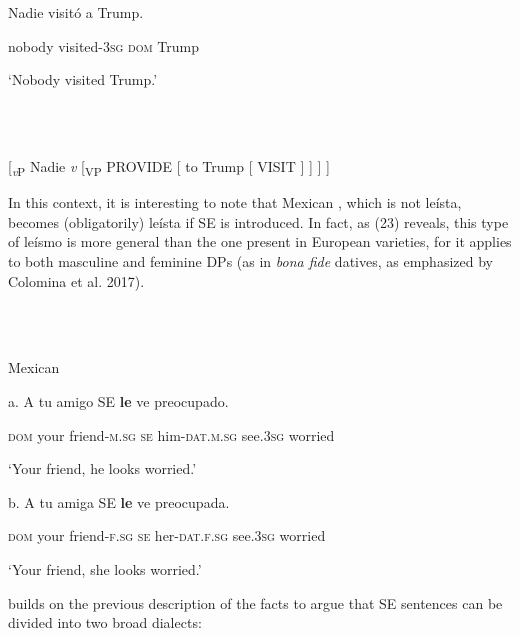 \documentclass[output=paper]{langsci/langscibook}
\begin{document}
\ea%
    \label{ex:key:21}
    \gll\\
        \\
    \glt
    \z


Nadie    visitó             a          Trump.   

nobody  visited\textsc{{}-3}\textsc{sg  dom}   Trump

‘Nobody visited Trump.’

\ea%
    \label{ex:key:22}
    \gll\\
        \\
    \glt
    \z

          [\textit{\textsubscript{v}}\textsubscript{P} Nadie \textit{v} [\textsubscript{VP} PROVIDE [ to Trump [ VISIT ] ] ] ]

In this context, it is interesting to note that Mexican , which is not leísta, becomes (obligatorily) leísta if SE is introduced. In fact, as (23) reveals, this type of leísmo is more general than the one present in European varieties, for it applies to both masculine and feminine DPs (as in \textit{bona fide} datives, as emphasized by Colomina et al. 2017).

\ea%
    \label{ex:key:23}
    \gll\\
        \\
    \glt
    \z

          Mexican 

a. A       tu      amigo         SE  \textbf{le} ve         preocupado.  

            \textsc{dom}   your friend\textsc{{}-m.}\textsc{sg} \textsc{se}   him\textsc{{}-dat.m.}\textsc{sg}  see\textsc{.3sg} worried

      ‘Your friend, he looks worried.’

  b. A       tu      amiga        SE  \textbf{le} ve          preocupada. 

            \textsc{dom}   your friend\textsc{{}-f.}\textsc{sg} \textsc{se}   her\textsc{{}-dat.f.}\textsc{sg} see\textsc{.3sg} worried

      ‘Your friend, she looks worried.’

\citet{Gallego2016} builds on the previous description of the facts to argue that  SE sentences can be divided into two broad dialects:

\ea%
    \label{ex:key:24}
    \gll\\
        \\
    \glt
    \z
\end{document}
